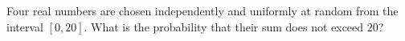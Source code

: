 Four real numbers are chosen independently and uniformly at random from the interval $[0,20]$. What is the probability that their sum does not exceed $20$?
